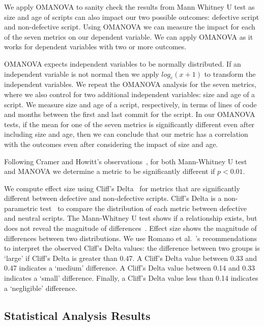 \documentclass[smallextended]{svjour3}       %
\begin{document}
\begin{itemize}
{    We apply OMANOVA to sanity check the results from Mann Whitney U test as size and age of scripts can also impact our two possible outcomes: defective script and non-defective script. Using OMANOVA we can measure the impact for each of the seven metrics on our dependent variable. We can apply OMANOVA as it works for dependent variables with two or more outcomes.  
    
    OMANOVA expects independent variables to be normally distributed. If an independent variable is not normal then we apply $log_{e}(x+1)$ to transform the independent variables. We repeat the OMANOVA analysis for the seven metrics, where we also control for two additional independent variables: size and age of a script. We measure size and age of a script, respectively, in terms of lines of code and months between the first and last commit for the script. In our OMANOVA tests, if the mean for one of the seven metrics is significantly different even after including size and age, then we can conclude that our metric has a correlation with the outcomes even after considering the impact of size and age. 
    }
\end{itemize}

Following Cramer and Howitt's observations~\citep{cramer2004:pval:99}, for both Mann-Whitney U test and MANOVA we determine a metric to be significantly different if $p < 0.01$.  

We compute effect size using Cliff's Delta~\citep{cliff1993:original} for metrics that are significantly different between defective and non-defective scripts. Cliff's Delta is a non-parametric test~\citep{cliff1993:original} to compare the distribution of each metric between defective and neutral scripts. The Mann-Whitney U test shows if a relationship exists, but does not reveal the magnitude of differences~\citep{p:not:enough}. Effect size shows the magnitude of differences between two distributions. We use Romano et al.~\citep{Romano:CliffsCutoff2006}'s recommendations to interpret the observed Cliff's Delta values: the difference between two groups is `large' if Cliff's Delta is greater than 0.47. A Cliff's Delta value between 0.33 and 0.47 indicates a `medium' difference. A Cliff's Delta value between 0.14 and 0.33 indicates a `small' difference. Finally, a Cliff's Delta value less than 0.14 indicates a `negligible' difference.  

\subsection{Statistical Analysis Results}
\label{res-rq1} 
\end{document}
